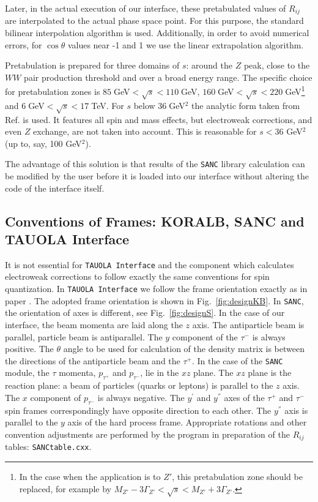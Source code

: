 \documentclass[]{Tauola_interface_design}
\begin{document}
Later, in the actual execution of our interface, 
these pretabulated values of $R_{ij}$ are interpolated to the actual phase space point.
 For this purpose, the standard bilinear interpolation algorithm 
is used. Additionally, in order to avoid numerical errors, for $\cos\theta$ values near -1 and 1 we use the linear extrapolation algorithm.


Pretabulation is prepared for  three domains of  $s$: around the $Z$ peak, close to the $WW$ 
pair production threshold and over a broad energy range. The specific choice for 
pretabulation zones is  $ 85\; $GeV$ < \sqrt{s} < 110\; $GeV,  
$160\; $GeV$< \sqrt{s}< 220\; $GeV\footnote{ In the case when the application is to $Z'$, this
pretabulation zone should be replaced, for example by 
$ M_{Z'}- 3\Gamma_{Z'}< \sqrt{s} < M_{Z'}+ 3\Gamma_{Z'}$.} and
$6\; $GeV$< \sqrt{s}< 17\; $TeV.  For $s$ below $36\; $GeV$^2$ the analytic form taken from 
Ref. \cite{Jadach:1985ac} is used.
 It features all spin and mass effects, but electroweak corrections, and even 
$Z$ exchange, are not taken into account. This is reasonable for $s<36$ GeV$^2$
(up to, say, 100 GeV$^2$).

The advantage of this solution is that results of the {\tt SANC} library calculation can be modified by the user before it is 
loaded into our interface without altering the code of the interface itself.

 


\subsection {Conventions of Frames: KORALB, SANC and TAUOLA Interface}
\label{subsection:KORALBSANC}
It is not essential for {\tt TAUOLA Interface}  and the component which calculates electroweak 
corrections to follow exactly the same conventions for spin quantization. 
In {\tt TAUOLA Interface} we 
follow the frame orientation exactly as in  paper 
\cite{jadach-was:1984}. The adopted frame orientation is shown in Fig.~\ref{fig:designKB}.
In {\tt SANC}, the orientation of axes is different, see Fig.~\ref{fig:designS}.
In the case of our interface, the beam momenta are laid along the $z$ axis.  The antiparticle beam is parallel, particle beam is antiparallel.
The $y$ component of the $\tau^-$ is always positive.
The $\theta$ angle to be used for calculation of the density matrix is between
the directions of the antiparticle beam and the $\tau^+$.
In the case of the {\tt SANC} module, the $\tau$ momenta, $p_{\tau^+}$ and $p_{\tau^-}$, lie in the $xz$ plane. The $xz$ plane is the reaction plane: a beam of particles (quarks or leptons) is parallel to the $z$ axis.
The $x$ component of $p_{\tau^-}$ is always negative.
The $y^{'}$ and $y^{''}$ axes of the $\tau^+$ and $\tau^-$ spin frames correspondingly have opposite direction to each other. The $y^{''}$ axis
is parallel to the $y$ axis of the hard process frame.
Appropriate rotations and other convention adjustments are performed by the program in preparation of the $R_{ij}$ tables: 
{\tt SANCtable.cxx}.
\end{document}

